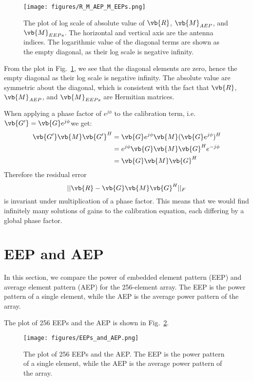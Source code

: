 \documentclass[10pt,a4paper,twocolumn]{paper}
\begin{document}
\begin{figure}[H]
    \centering
    \texttt{[image: figures/R\_M\_AEP\_M\_EEPs.png]}
    \caption{The plot of log scale of absolute value of $\vb{R}$, $\vb{M}_{AEP}$, and $\vb{M}_{EEPs}$. The horizontal and vertical axis are the antenna indices. The logarithmic value of the diagonal terms are shown as the empty diagonal, as their log scale is negative infinity.}
    \label{fig:R_M_AEP_M_EEPs}
\end{figure}

From the plot in Fig.~\ref{fig:R_M_AEP_M_EEPs}, we see that the diagonal elements are zero, hence the empty diagonal as their log scale is negative infinity. The absolute value are symmetric about the diagonal, which is consistent with the fact that $\vb{R}$, $\vb{M}_{AEP}$, and $\vb{M}_{EEPs}$ are Hermitian matrices.

When applying a phase factor of $e^{j\phi}$ to the calibration term, i.e. $\vb{G'} = \vb{G}e^{j\phi}$we get:
\begin{align*}
        \vb{G'}\vb{M}\vb{G'}^{H}
        &= \vb{G}e^{j\phi}\vb{M}(\vb{G}e^{j\phi})^{H}\\
        &= e^{j\phi}\vb{G}\vb{M}\vb{G}^{H}e^{-j\phi}\\
        &= \vb{G}\vb{M}\vb{G}^{H}
\end{align*}
Therefore the residual error 
\begin{equation}
    ||\vb{R} - \vb{G}\vb{M}\vb{G}^{H}||_{F}
    \label{eq:F_norm_error}
\end{equation}
is invariant under multiplication of a phase factor.
This means that we would find infinitely many solutions of gains to the calibration equation, each differing by a global phase factor. 

\section{EEP and AEP}
In this section, we compare the power of embedded element pattern (EEP) and average element pattern (AEP) for the 256-element array. The EEP is the power pattern of a single element, while the AEP is the average power pattern of the array.

The plot of 256 EEPs and the AEP is shown in Fig.~\ref{fig:EEPs_and_AEP}. 
\begin{figure}[H]
    \centering
    \texttt{[image: figures/EEPs\_and\_AEP.png]}
    \caption{The plot of 256 EEPs and the AEP. The EEP is the power pattern of a single element, while the AEP is the average power pattern of the array.}
    \label{fig:EEPs_and_AEP}
\end{figure}
\end{document}
